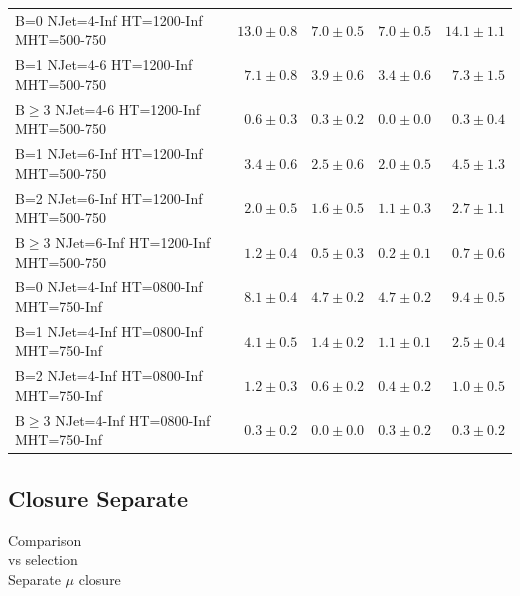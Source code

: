 \documentclass{beamer}
\begin{document}
\begin{frame}
\begin{tabular}{lrrrr}
   B=0 NJet=4-Inf HT=1200-Inf MHT=500-750 &              $13.0\pm0.8$&               $7.0\pm0.5$&               $7.0\pm0.5$&                  $14.1\pm1.1$ \\ 
     B=1 NJet=4-6 HT=1200-Inf MHT=500-750 &               $7.1\pm0.8$&               $3.9\pm0.6$&               $3.4\pm0.6$&                   $7.3\pm1.5$ \\ 
     $\text{B}\geq3$ NJet=4-6 HT=1200-Inf MHT=500-750 &               $0.6\pm0.3$&               $0.3\pm0.2$&               $0.0\pm0.0$&                   $0.3\pm0.4$ \\ 
   B=1 NJet=6-Inf HT=1200-Inf MHT=500-750 &               $3.4\pm0.6$&               $2.5\pm0.6$&               $2.0\pm0.5$&                   $4.5\pm1.3$ \\ 
   B=2 NJet=6-Inf HT=1200-Inf MHT=500-750 &               $2.0\pm0.5$&               $1.6\pm0.5$&               $1.1\pm0.3$&                   $2.7\pm1.1$ \\ 
   $\text{B}\geq3$ NJet=6-Inf HT=1200-Inf MHT=500-750 &               $1.2\pm0.4$&               $0.5\pm0.3$&               $0.2\pm0.1$&                   $0.7\pm0.6$ \\ 
   B=0 NJet=4-Inf HT=0800-Inf MHT=750-Inf &               $8.1\pm0.4$&               $4.7\pm0.2$&               $4.7\pm0.2$&                   $9.4\pm0.5$ \\ 
   B=1 NJet=4-Inf HT=0800-Inf MHT=750-Inf &               $4.1\pm0.5$&               $1.4\pm0.2$&               $1.1\pm0.1$&                   $2.5\pm0.4$ \\ 
   B=2 NJet=4-Inf HT=0800-Inf MHT=750-Inf &               $1.2\pm0.3$&               $0.6\pm0.2$&               $0.4\pm0.2$&                   $1.0\pm0.5$ \\ 
   $\text{B}\geq3$ NJet=4-Inf HT=0800-Inf MHT=750-Inf &               $0.3\pm0.2$&               $0.0\pm0.0$&               $0.3\pm0.2$&                   $0.3\pm0.2$ \\ 
\bottomrule 
\end{tabular}

\end{frame}

\subsection{Closure Separate}
\begin{frame}
 \begin{center}
    {\Large Comparison \\ \deltaphi vs \mindeltaphi selection\\ Separate $\mu$ closure}
  \end{center}
\end{frame}
\end{document}
